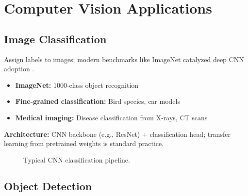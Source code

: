 
\section{Computer Vision Applications}
\label{sec:cv-applications}

\subsection{Image Classification}

Assign labels to images; modern benchmarks like ImageNet catalyzed deep CNN adoption  \textcite{Krizhevsky2012,He2016,GoodfellowEtAl2016,Prince2023}.
\begin{itemize}
    \item \textbf{ImageNet:} 1000-class object recognition
    \item \textbf{Fine-grained classification:} Bird species, car models
    \item \textbf{Medical imaging:} Disease classification from X-rays, CT scans
\end{itemize}

\textbf{Architecture:} CNN backbone (e.g., ResNet) + classification head; transfer learning from pretrained weights is standard practice.

\begin{figure}[h]
  \centering
  \caption{Typical CNN classification pipeline.}
  \label{fig:cnn-pipeline}
\end{figure}

\subsection{Object Detection}

